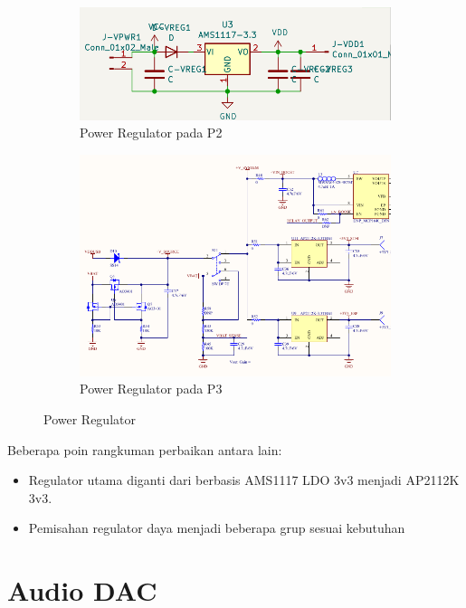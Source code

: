 \documentclass{book} %
\begin{document}
    \begin{figure}[!ht]
    	\centering
    	\begin{subfigure}[t]{0.25\textwidth}
    		\includegraphics[width=\textwidth]{images/p2_vreg}
    		\caption{Power Regulator pada P2}
    	\end{subfigure}
    	\begin{subfigure}[t]{0.40\textwidth}
    		\includegraphics[width=\textwidth]{images/p3_vreg}
    		\caption{Power Regulator pada P3}
    	\end{subfigure}
    	\caption{Power Regulator}
    \end{figure}

	Beberapa poin rangkuman perbaikan antara lain:
	\begin{itemize}
		\item Regulator utama diganti dari berbasis AMS1117 LDO 3v3 menjadi AP2112K 3v3.
		\item Pemisahan regulator daya menjadi beberapa grup sesuai kebutuhan
	\end{itemize}
    
    \section{Audio DAC}
    
\end{document}
